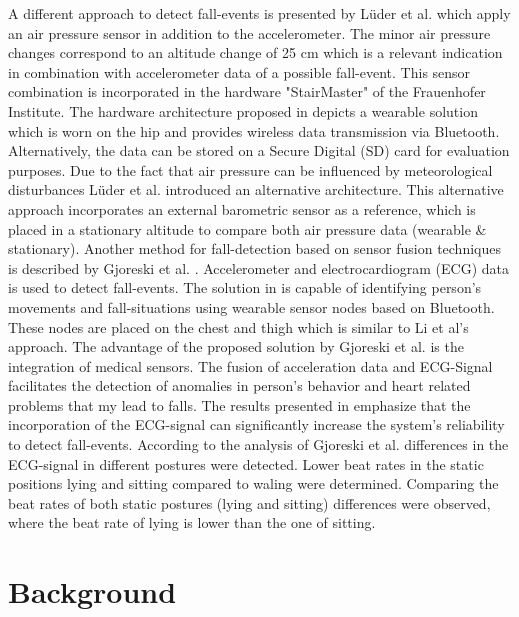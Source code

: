 \documentclass[review]{elsarticle}
\begin{document}
A different approach to detect fall-events is presented by Lüder et al. \cite{Luder2009} which apply an air pressure sensor in addition to the accelerometer. The minor air pressure changes correspond to an altitude change of 25 cm which is a relevant indication in combination with accelerometer data of a possible fall-event.  This sensor combination is incorporated in the hardware "StairMaster" of the Frauenhofer Institute. The hardware architecture proposed in \cite{Luder2009} depicts a wearable solution which is worn on the hip and provides wireless data transmission via Bluetooth. Alternatively, the data can be stored on a Secure Digital (SD) card for evaluation purposes. Due to the fact that air pressure can be influenced by meteorological disturbances Lüder et al. \cite{Luder2009} introduced an alternative architecture. This alternative approach incorporates an external barometric sensor as a reference, which is placed in a stationary altitude to compare both air pressure data (wearable \& stationary). Another method for fall-detection based on sensor fusion techniques is described by Gjoreski et al. \cite{Gjoreski2014}. Accelerometer and electrocardiogram (ECG) data is used to detect fall-events. The solution in \cite{Gjoreski2014} is capable of identifying person's movements and fall-situations using wearable sensor nodes based on Bluetooth. These nodes are placed on the chest and thigh which is similar to Li et al's \cite{Li2009} approach. The advantage of the proposed solution by Gjoreski et al. \cite{Gjoreski2014} is the integration of medical sensors. The fusion of acceleration data and ECG-Signal facilitates the detection of anomalies in person's behavior and heart related problems that my lead to falls. The results presented in \cite{Gjoreski2014} emphasize that the incorporation of the ECG-signal can significantly increase the system's reliability to detect fall-events. According to the analysis of Gjoreski et al. \cite{Gjoreski2014} differences in the ECG-signal in different postures were detected. Lower beat rates in the static positions lying and sitting compared to waling were determined. Comparing the beat rates of both static postures (lying and sitting) differences were observed, where the beat rate of lying is lower than the one of sitting.



\section{Background}
\label{sec:background}
\end{document}

